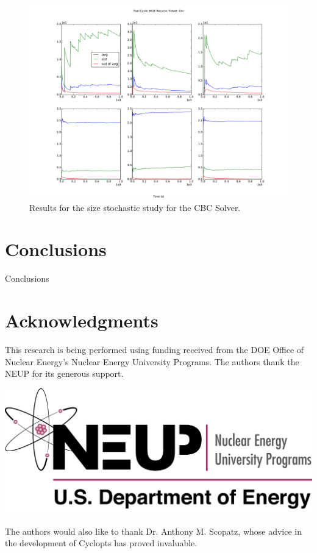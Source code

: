 \documentclass{anstrans}
\begin{document}
\begin{figure}
  \begin{center}
    \includegraphics[width=1.5\columnwidth]{1k_avg_front_time_fc1_solvercbc.pdf}
    \caption[]{
      \label{fig:cbc_stochastic}
      Results for the size stochastic study for the CBC Solver.
      }
  \end{center}
\end{figure}

\section{Conclusions}


Conclusions

\section{Acknowledgments}

This research is being performed using funding received from the DOE
Office of Nuclear Energy's Nuclear Energy University Programs.  The
authors thank the NEUP for its generous support.

\begin{center}
\includegraphics[width=.25\columnwidth]{neup_logo_large.jpg}
\end{center}

The authors would also like to thank Dr. Anthony M. Scopatz, whose advice in the
development of Cyclopts has proved invaluable.



\end{document}
